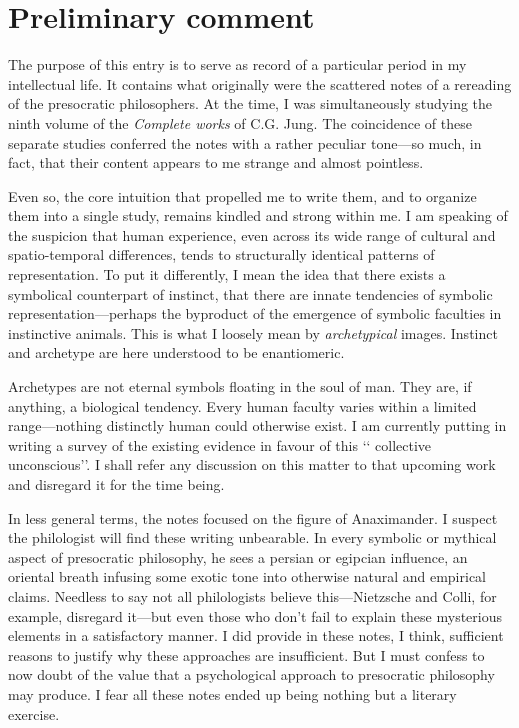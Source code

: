 \documentclass[a4paper]{article}
\begin{document}
\section{Preliminary comment}

The purpose of this entry is to serve as record of a particular period in my
intellectual life. It contains what originally were the scattered notes of a
rereading of the presocratic philosophers. At the time, I was simultaneously
studying the ninth volume of the \textit{Complete works} of C.G. Jung. The
coincidence of these separate studies conferred the notes with a rather peculiar
tone---so much, in fact, that their content appears to me strange and almost
pointless.

Even so, the core intuition that propelled me to write them, and to organize
them into a single study, remains kindled and strong within me. I am speaking of
the suspicion that human experience, even across its wide range of cultural and
spatio-temporal differences, tends to structurally identical patterns of
representation. To put it differently, I mean the idea that there exists a
symbolical counterpart of instinct, that there are innate tendencies of symbolic
representation---perhaps the byproduct of the emergence of symbolic faculties in
instinctive animals. This is what I loosely mean by \textit{archetypical}
images. Instinct and archetype are here understood to be enantiomeric.

Archetypes are not eternal symbols floating in the soul of man. They are, if
anything, a biological tendency. Every human faculty varies within a limited
range---nothing distinctly human could otherwise exist. I am currently putting
in writing a survey of the existing evidence in favour of this \lq\lq
collective unconscious\rq\rq{}. I shall refer any discussion on this matter to
that upcoming work and disregard it for the time being.

In less general terms, the notes focused on the figure of Anaximander. I suspect
the philologist will find these writing unbearable. In every symbolic or
mythical aspect of presocratic philosophy, he sees a persian or egipcian
influence, an oriental breath infusing some exotic tone into otherwise natural
and empirical claims. Needless to say not all philologists believe
this---Nietzsche and Colli, for example, disregard it---but even those who
don't fail to explain these mysterious elements in a satisfactory manner. I did
provide in these notes, I think, sufficient reasons to justify why these
approaches are insufficient. But I must confess to now doubt of the value that a
psychological approach to presocratic philosophy may produce. I fear all these
notes ended up being nothing but a literary exercise.
\end{document}
